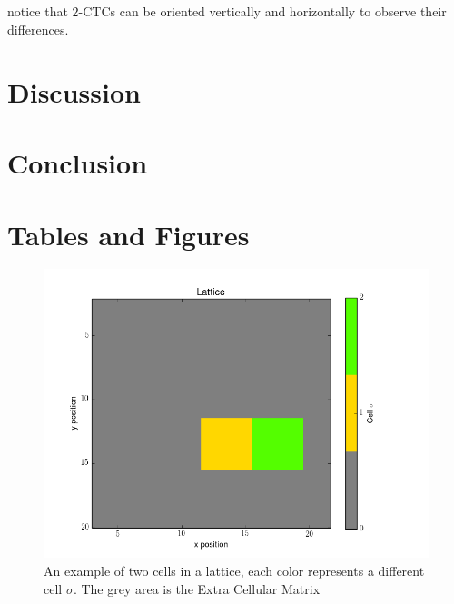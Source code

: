 \documentclass[12pt]{article}
\begin{document}
\subsection{}
 notice that $2$-CTCs can be oriented vertically and horizontally to observe their differences.




\section{Discussion}
\section{Conclusion}

\pagebreak
\section{Tables and Figures}

\begin{figure}[h]
	\centering
	\includegraphics[scale=0.5]{img/basic}
	\caption{An example of two cells in a lattice, each color represents a different cell $\sigma$. The grey area is the Extra Cellular Matrix}
	\label{basic}
\end{figure}
\end{document}
